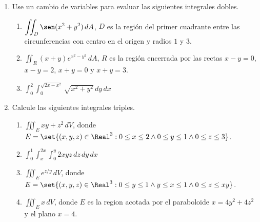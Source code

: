 \documentclass{article}
\begin{document}
\begin{enumerate}
  \vspace{2mm}
  \item Use un cambio de variables para evaluar las siguientes integrales dobles.
    \begin{enumerate}
      \item $\displaystyle\iint_D \sen(x^2+y^2)\,dA$, $D$ es la región del primer cuadrante entre las circunferencias con centro en el origen y radios $1$ y $3$.
      \item $\displaystyle\iint_R (x+y)e^{x^2-y^2}\,dA$, $R$ es la región encerrada por las rectas $x-y=0$, $x-y=2$, $x+y=0$ y $x+y=3$.
      \item $\displaystyle\int_0^2\int_0^{\sqrt{2x-x^2}}\sqrt{x^2+y^2}\,dy\,dx$
    \end{enumerate}
  \newpage
  \item Calcule las siguientes integrales triples.
    \begin{enumerate}
      \item $\displaystyle\iiint_E xy+z^2\,dV$, donde $E=\set{(x,y,z)\in\Real^3:0\leq x\leq2\wedge 0\leq y\leq 1\wedge 0\leq z\leq 3}$.
      \item $\displaystyle\int_0^1\int_{x}^{2x}\int_0^y 2xyz\,dz\,dy\,dx$
      \item $\displaystyle\iiint_E e^{z/y}\,dV$, donde $E=\set{(x,y,z)\in\Real^3:0\leq y\leq 1\wedge y\leq x\leq 1\wedge 0\leq z\leq xy}$.
      \item $\displaystyle\iiint_E x\,dV$, donde $E$ es la region acotada por el paraboloide $x=4y^2+4z^2$ y el plano $x=4$.
    \end{enumerate}
\end{enumerate}
\end{document}
